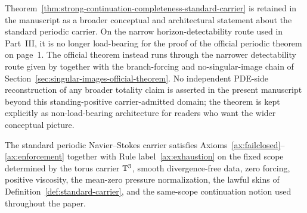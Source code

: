 \begin{remark}
Theorem~\ref{thm:strong-continuation-completeness-standard-carrier} is retained in the manuscript as a broader conceptual and architectural statement about the standard periodic carrier. On the narrow horizon-detectability route used in Part~III, it is no longer load-bearing for the proof of the official periodic theorem on page~1. The official theorem instead runs through the narrower detectability route given by \HorizonDetectabilityRef{} together with the branch-forcing and no-singular-image chain of Section~\ref{sec:singular-images-official-theorem}. No independent PDE-side reconstruction of any broader totality claim is asserted in the present manuscript beyond this standing-positive carrier-admitted domain; the theorem is kept explicitly as non-load-bearing architecture for readers who want the wider conceptual picture.
\end{remark}

\begin{theorem}
\label{thm:ns-carrier-verifies-rule-package}
The standard periodic Navier--Stokes carrier satisfies Axioms~\ref{ax:failclosed}--\ref{ax:enforcement} together with Rule label~\ref{ax:exhaustion}
on the fixed scope determined by the torus carrier $\mathbb{T}^3$, smooth divergence-free data, zero forcing,
positive viscosity, the mean-zero pressure normalization, the lawful skins of
Definition~\ref{def:standard-carrier}, and the same-scope continuation notion used throughout the paper.
\end{theorem}

